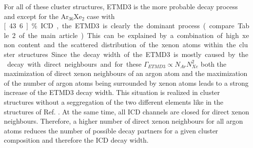 For all of these cluster structures, ETMD3 is the more probable decay process and
except for the Ar$_{36}$Xe$_2$ case with \unit[43.6]{\%} ICD, the ETMD3 is clearly
the dominant process (compare Table 2 of the main article).
This can be explained by a combination of high xenon content and the
scattered distribution of the xenon atoms within the cluster structures.
Since the decay width of the ETMD3 is mostly caused by the decay
with direct neighbours and for these $\Gamma_{ETMD3} \propto N_{Ar} N_{Xe}^2$
both the maximization of direct xenon neighbours of an argon atom and the
maximization of the number of argon atoms being surrounded by xenon atoms
leads to a strong increase of the ETMD3 decay width. This situation is realized
in cluster structures without a seggregation of the two different elements like
in the structures of Ref. \cite{}. At the same time, all ICD channels are closed
for direct xenon neighbours. Therefore, a higher number of direct xenon neighbours
for all argon atoms reduces the number of possible decay partners for a given
cluster composition and therefore the ICD decay width.



%
